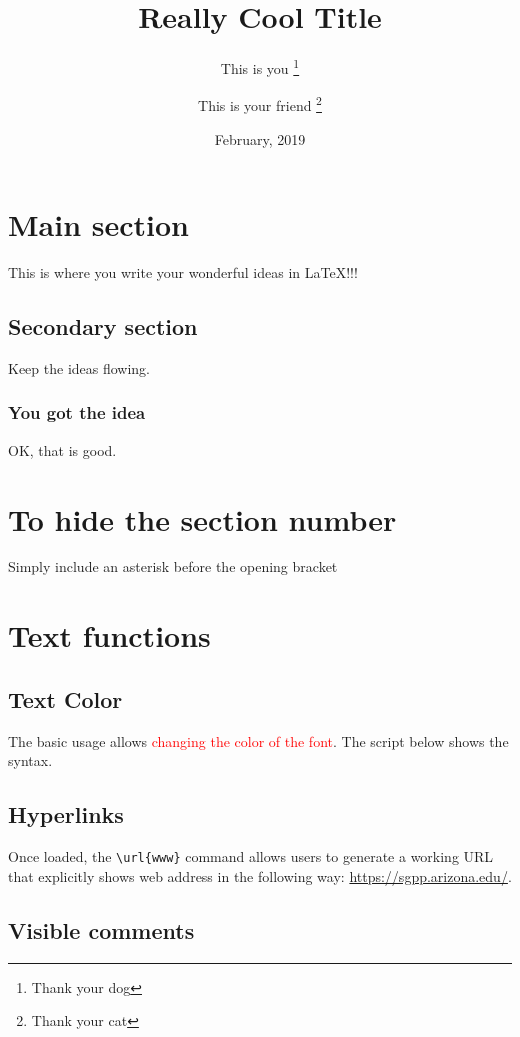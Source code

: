 \documentclass[12pt,letterpaper]{article}
\title{Really Cool Title}
\author[1]{This is you \thanks{Thank your dog}}
\author[2]{This is your friend \thanks{Thank your cat}}
\affil[1]{Department A}
\affil[2]{Department D}
\date{February, 2019}
\begin{document}
\maketitle
\tableofcontents{}

\newpage
\section{Main section}
This is where you write your wonderful ideas in \LaTeX!!!
    \subsection{Secondary section}
    Keep the ideas flowing.
        \subsubsection{You got the idea}
        OK, that is good.
\section*{To hide the section number}
Simply include an asterisk before the opening bracket


\section{Text functions}


\subsection{Text Color}

The basic usage allows \textcolor{red}{changing the color of the font}. The script below shows the syntax.

\subsection{Hyperlinks}

Once loaded, the  \texttt{\textbackslash url\{www\}} command allows users to generate a working URL that explicitly shows web address in the following way: \url{https://sgpp.arizona.edu/}.


\subsection{Visible comments}
\end{document}
